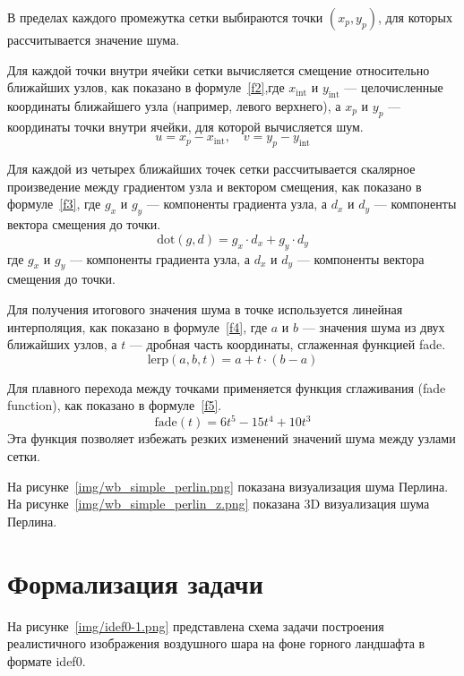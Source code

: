 В пределах каждого промежутка сетки выбираются точки $(x_p, y_p)$, для которых рассчитывается значение шума.

Для каждой точки внутри ячейки сетки вычисляется смещение относительно ближайших узлов, как показано в формуле~\ref{f2},где $x_{\text{int}}$ и $y_{\text{int}}$ — целочисленные координаты ближайшего узла (например, левого верхнего), а $x_p$ и $y_p$ — координаты точки внутри ячейки, для которой вычисляется шум.
\begin{equation}
u = x_p - x_{\text{int}}, \quad v = y_p - y_{\text{int}}
\label{f2}
\end{equation}


Для каждой из четырех ближайших точек сетки рассчитывается скалярное произведение между градиентом узла и вектором смещения, как показано в формуле~\ref{f3}, где $g_x$ и $g_y$ — компоненты градиента узла, а $d_x$ и $d_y$ — компоненты вектора смещения до точки.
\begin{equation}
\text{dot}(g, d) = g_x \cdot d_x + g_y \cdot d_y
\label{f3}
\end{equation}
где $g_x$ и $g_y$ — компоненты градиента узла, а $d_x$ и $d_y$ — компоненты вектора смещения до точки.

Для получения итогового значения шума в точке используется линейная интерполяция, как показано в формуле~\ref{f4}, где $a$ и $b$ — значения шума из двух ближайших узлов, а $t$ — дробная часть координаты, сглаженная функцией fade.
\begin{equation}
\text{lerp}(a, b, t) = a + t \cdot (b - a)
\label{f4}
\end{equation}


Для плавного перехода между точками применяется функция сглаживания (fade function), как показано в формуле~\ref{f5}.
\begin{equation}
\text{fade}(t) = 6t^5 - 15t^4 + 10t^3
\label{f5}
\end{equation}
Эта функция позволяет избежать резких изменений значений шума между узлами сетки.

На рисунке~\ref{img/wb_simple_perlin.png} показана визуализация шума Перлина. На рисунке~\ref{img/wb_simple_perlin_z.png} показана 3D визуализация шума Перлина.



\section{Формализация задачи}
На рисунке~\ref{img/idef0-1.png} представлена схема задачи построения реалистичного изображения воздушного шара на фоне горного ландшафта в формате idef0.

